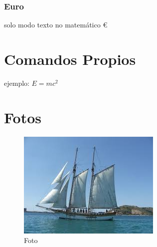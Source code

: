 \documentclass[a4paper,11pt]{article}
\begin{document}
\section{Euro}
 solo modo texto no matemático \euro\
 \part{Comandos Propios}
 \newcommand{\nombre}{definicion}
 ejemplo:
 \newcommand{\einstein}{$E=mc^2$}
 \einstein\
\part{Fotos}
\begin{figure}[!h]
\includegraphics[scale=.75]{indice.jpg} %
\caption{Foto}%
\label{fig:indice.jpg}
\end{figure}
\end{document}
